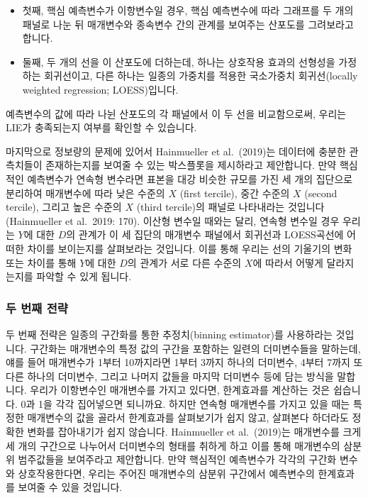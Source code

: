 \documentclass[
]{book}
\begin{document}
\begin{itemize}
\item
  첫째, 핵심 예측변수가 이항변수일 경우, 핵심 예측변수에 따라 그래프를 두 개의 패널로 나눈 뒤 매개변수와 종속변수 간의 관계를 보여주는 산포도를 그려보라고 합니다.
\item
  둘째, 두 개의 선을 이 산포도에 더하는데, 하나는 상호작용 효과의 선형성을 가정하는 회귀선이고, 다른 하나는 일종의 가중치를 적용한 국소가중치 회귀선(locally weighted regression; LOESS)입니다.
\end{itemize}

예측변수의 값에 따라 나뉜 산포도의 각 패널에서 이 두 선을 비교함으로써, 우리는 LIE가 충족되는지 여부를 확인할 수 있습니다.

마지막으로 정보량의 문제에 있어서 Hainmueller et al.~(2019)는 데이터에 충분한 관측치들이 존재하는지를 보여줄 수 있는 박스플롯을 제시하라고 제안합니다. 만약 핵심적인 예측변수가 연속형 변수라면 표본을 대강 비슷한 규모를 가진 세 개의 집단으로 분리하여 매개변수에 따라 낮은 수준의 \(X\) (first tercile), 중간 수준의 \(X\) (second tercile), 그리고 높은 수준의 \(X\) (third tercile)의 패널로 나타내라는 것입니다(Hainmueller et al.~2019: 170). 이산형 변수일 때와는 달리, 연속형 변수일 경우 우리는 \(Y\)에 대한 \(D\)의 관계가 이 세 집단의 매개변수 패널에서 회귀선과 LOESS곡선에 어떠한 차이를 보이는지를 살펴보라는 것입니다. 이를 통해 우리는 선의 기울기의 변화 또는 차이를 통해 \(Y\)에 대한 \(D\)의 관계가 서로 다른 수준의 \(X\)에 따라서 어떻게 달라지는지를 파악할 수 있게 됩니다.

\hypertarget{uxb450-uxbc88uxc9f8-uxc804uxb7b5}{%
\subsubsection{두 번째 전략}\label{uxb450-uxbc88uxc9f8-uxc804uxb7b5}}

두 번째 전략은 일종의 구간화를 통한 추정치(binning estimator)를 사용하라는 것입니다. 구간화는 매개변수의 특정 값의 구간을 포함하는 일련의 더미변수들을 말하는데, 얘를 들어 매개변수가 1부터 10까지라면 1부터 3까지 하나의 더미변수, 4부터 7까지 또 다른 하나의 더미변수, 그리고 나머지 값들을 마지막 더미변수 등에 담는 방식을 말합니다. 우리가 이항변수인 매개변수를 가지고 있다면, 한계효과를 계산하는 것은 쉽습니다. 0과 1을 각각 집어넣으면 되니까요. 하지만 연속형 매개변수를 가지고 있을 때는 특정한 매개변수의 값을 골라서 한계효과를 살펴보기가 쉽지 않고, 살펴본다 하더라도 정확한 변화를 잡아내기가 쉽지 않습니다. Hainmueller et al.~(2019)는 매개변수를 크게 세 개의 구간으로 나누어서 더미변수의 형태를 취하게 하고 이를 통해 매개변수의 삼분위 범주값들을 보여주라고 제안합니다. 만약 핵심적인 예측변수가 각각의 구간화 변수와 상호작용한다면, 우리는 주어진 매개변수의 삼분위 구간에서 예측변수의 한계효과를 보여줄 수 있을 것입니다.
\end{document}
